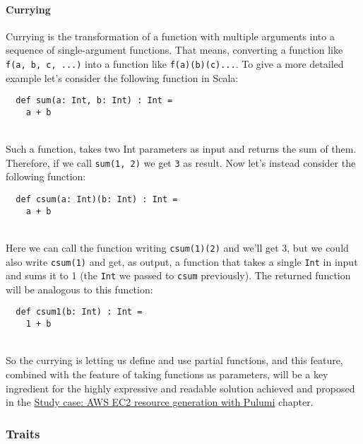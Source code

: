 \paragraph{Currying}
Currying is the transformation of a function with multiple arguments into a sequence of single-argument functions. That means, converting a function like \texttt{f(a, b, c, ...)} into a function like \texttt{f(a)(b)(c)...}.
To give a more detailed example let's consider the following function in Scala:
\begin{verbatim}
  def sum(a: Int, b: Int) : Int = 
    a + b
\end{verbatim}\mbox{}\\
Such a function, takes two Int parameters as input and returns the sum of them.
Therefore, if we call \texttt{sum(1, 2)} we get \texttt{3} as result.
Now let's instead consider the following function:
\begin{verbatim}
  def csum(a: Int)(b: Int) : Int = 
    a + b
\end{verbatim}\mbox{}\\
Here we can call the function writing \texttt{csum(1)(2)} and we'll get 3, but we could also write \texttt{csum(1)} and get, as output, a function that takes a single \texttt{Int} in input and sums it to 1 (the \texttt{Int} we passed to \texttt{csum} previously).
The returned function will be analogous to this function:
\begin{verbatim}
  def csum1(b: Int) : Int = 
    1 + b
\end{verbatim}\mbox{}\\
So the currying is letting us define and use partial functions, and this feature, combined with the feature of taking functions as parameters, will be a key ingredient for the highly expressive and readable solution achieved and proposed in the \hyperref[cap:case-study]{Study case: AWS EC2 resource generation with Pulumi} chapter.

\subsubsection{Traits}

